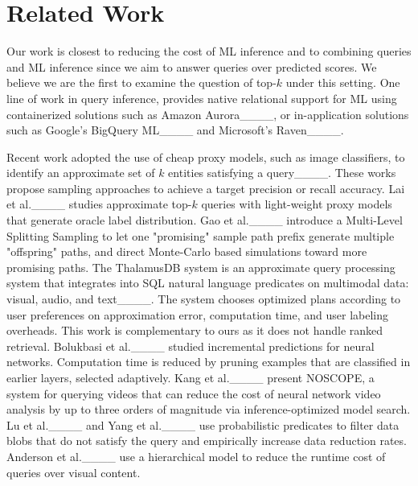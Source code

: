 \section{Related Work}
\label{sec:rel}
Our work is closest to reducing the cost of ML inference and to combining queries and ML inference since we aim to answer queries over predicted scores. We believe we are the first to examine the question of top-$k$ under this setting. 
One line of work in query inference, provides native relational support for ML  using containerized solutions such as Amazon Aurora____, or in-application solutions such as Google's BigQuery ML____ and Microsoft's Raven____. 

Recent work adopted the use of cheap proxy models, such as image classifiers, to identify  an  approximate  set of $k$ entities satisfying a query____. These works propose sampling approaches to achieve a target precision or recall accuracy. 
Lai et al.____ studies approximate top-$k$ queries with light-weight proxy models that generate oracle label distribution.
Gao et al.____ introduce a Multi-Level Splitting Sampling to let one "promising" sample path prefix generate multiple "offspring" paths, and direct Monte-Carlo based simulations toward more promising paths.  The ThalamusDB system is an approximate query processing system that integrates into SQL natural language predicates on multimodal data: visual, audio, and text____. The system chooses optimized plans according to user preferences on approximation error, computation time, and user labeling overheads. This work is complementary to ours as it does not handle ranked retrieval.
Bolukbasi et al.____ studied incremental predictions for neural networks.  
 Computation time is reduced by pruning examples that are classified in earlier layers, selected adaptively. 
Kang et al.____ present NOSCOPE, a system for querying videos that can reduce the cost of neural network video analysis by up to three orders of magnitude via inference-optimized model search.
Lu et al.____ and Yang et al.____ use probabilistic predicates to filter data blobs that do not satisfy the query and empirically increase data reduction rates. 
Anderson et al.____ use a hierarchical model to reduce the runtime cost of queries over visual content.